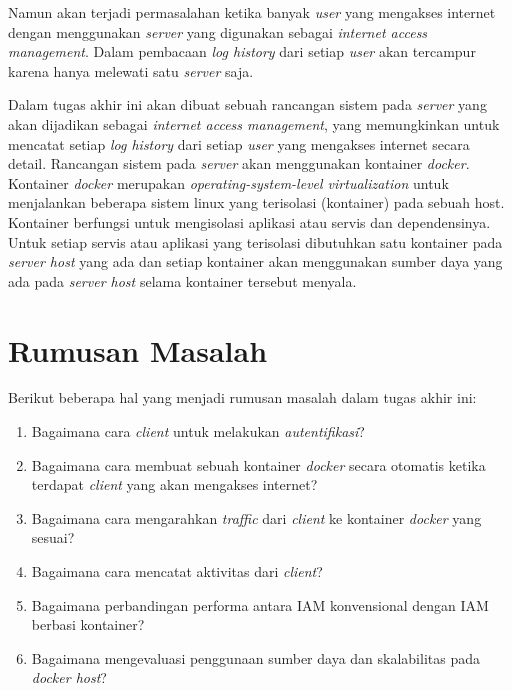 Namun akan terjadi permasalahan ketika banyak \textit{user} yang mengakses internet dengan menggunakan \textit{server} yang digunakan sebagai \textit{internet access management}. Dalam pembacaan \textit{log history} dari setiap \textit{user} akan tercampur karena hanya melewati satu \textit{server} saja. 

Dalam tugas akhir ini akan dibuat sebuah rancangan sistem pada \textit{server} yang akan dijadikan sebagai \textit{internet access management}, yang memungkinkan untuk mencatat setiap \textit{log history} dari setiap \textit{user} yang mengakses internet secara detail. Rancangan sistem pada \textit{server} akan menggunakan kontainer \textit{docker}. Kontainer \textit{docker} merupakan \textit{operating-system-level virtualization} untuk menjalankan beberapa sistem linux yang terisolasi (kontainer) pada sebuah host. Kontainer berfungsi untuk mengisolasi aplikasi atau servis dan dependensinya. Untuk setiap servis atau aplikasi yang terisolasi dibutuhkan satu kontainer pada \textit{server host} yang ada dan setiap kontainer akan menggunakan sumber daya yang ada pada \textit{server host} selama kontainer tersebut menyala.

\section{Rumusan Masalah}
Berikut beberapa hal yang menjadi rumusan masalah dalam tugas akhir ini:
\begin{enumerate}
	\item Bagaimana cara \textit{client} untuk melakukan \textit{autentifikasi}?
	\item Bagaimana cara membuat sebuah kontainer \textit{docker} secara otomatis ketika terdapat \textit{client} yang akan mengakses internet?
	\item Bagaimana cara mengarahkan \textit{traffic} dari \textit{client} ke kontainer \textit{docker} yang sesuai?
	\item Bagaimana cara mencatat aktivitas dari \textit{client}?
	\item Bagaimana perbandingan performa antara IAM konvensional dengan IAM berbasi kontainer?
	\item Bagaimana mengevaluasi penggunaan sumber daya dan skalabilitas pada \textit{docker host}?
\end{enumerate}

